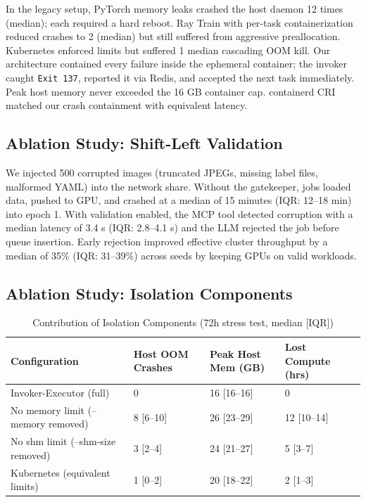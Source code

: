 \documentclass[10pt,twocolumn,letterpaper]{article}
\begin{document}
In the legacy setup, PyTorch memory leaks crashed the host daemon 12 times (median); each required a hard reboot. Ray Train with per-task containerization reduced crashes to 2 (median) but still suffered from aggressive preallocation. Kubernetes enforced limits but suffered 1 median cascading OOM kill. Our architecture contained every failure inside the ephemeral container; the invoker caught \texttt{Exit 137}, reported it via Redis, and accepted the next task immediately. Peak host memory never exceeded the 16 GB container cap. containerd CRI matched our crash containment with equivalent latency.

\subsection{Ablation Study: Shift-Left Validation}
We injected 500 corrupted images (truncated JPEGs, missing label files, malformed YAML) into the network share. Without the gatekeeper, jobs loaded data, pushed to GPU, and crashed at a median of 15 minutes (IQR: 12--18 min) into epoch 1. With validation enabled, the MCP tool detected corruption with a median latency of 3.4 s (IQR: 2.8--4.1 s) and the LLM rejected the job before queue insertion. Early rejection improved effective cluster throughput by a median of 35\% (IQR: 31--39\%) across seeds by keeping GPUs on valid workloads.

\subsection{Ablation Study: Isolation Components}
\begin{table}[htbp]
\centering
\caption{Contribution of Isolation Components (72h stress test, median [IQR])}
\label{tab:ablation_components}
\begin{tabular}{@{}llll@{}}
\toprule
Configuration & Host OOM Crashes & Peak Host Mem (GB) & Lost Compute (hrs) \\ \midrule
Invoker-Executor (full) & 0 & 16 [16--16] & 0 \\
No memory limit (--memory removed) & 8 [6--10] & 26 [23--29] & 12 [10--14] \\
No shm limit (--shm-size removed) & 3 [2--4] & 24 [21--27] & 5 [3--7] \\
Kubernetes (equivalent limits) & 1 [0--2] & 20 [18--22] & 2 [1--3] \\ \bottomrule
\end{tabular}
\end{table}
\end{document}
